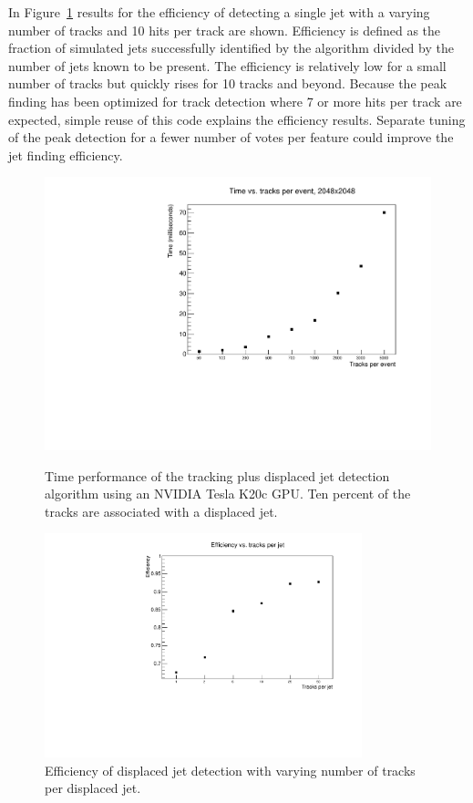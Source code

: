 \documentclass{JINST}
\begin{document}
In Figure~\ref{fig:eff_num_tracks_per_singularity} results for the efficiency of detecting a single jet with a varying number of tracks and 10 hits per track are shown.  Efficiency is defined as the fraction of simulated jets successfully identified by the algorithm divided by the number of jets known to be present.  The efficiency is relatively low for a small number of tracks but quickly rises for 10 tracks and beyond.  Because the peak finding has been optimized for track detection where 7 or more hits per track are expected, simple reuse of this code explains the efficiency results.  Separate tuning of the peak detection for a fewer number of votes per feature could improve the jet finding efficiency.
%
\begin{figure}[!Hhtb]
\begin{minipage}[t]{8cm}
\begin{center}
\includegraphics[width=0.8 \textwidth]{figs/performance.pdf}
 \caption{Time performance of the tracking plus displaced jet detection algorithm using an NVIDIA Tesla K20c GPU.  
          Ten percent of the tracks are associated with a displaced jet. \label{fig:performance}}
\end{center}
\end{minipage}\quad
\begin{minipage}[t]{8cm}
\begin{center}
\includegraphics[width=0.82\textwidth]{figs/eff_num_tracks_per_singularity.pdf} 
\caption{Efficiency of displaced jet detection with varying number of tracks per displaced jet.\label{fig:eff_num_tracks_per_singularity}}
\end{center}
\end{minipage}
\end{figure}
\end{document}
